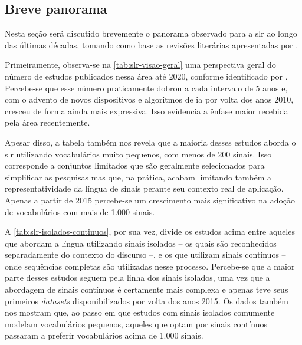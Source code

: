 \subsection{Breve panorama}
\label{sec:slr-breve-panorama}

Nesta seção será discutido brevemente o panorama observado para a \acrshort{slr} ao longo das últimas décadas, tomando como base as revisões literárias apresentadas por .



Primeiramente, observa-se na \autoref{tab:slr-visao-geral} uma perspectiva geral do número de estudos publicados nessa área até 2020, conforme identificado por .
Percebe-se que esse número praticamente dobrou a cada intervalo de 5 anos e, com o advento de novos dispositivos e algoritmos de \acrshort{ia} por volta dos anos 2010, cresceu de forma ainda mais expressiva. Isso evidencia a ênfase maior recebida pela área recentemente.

Apesar disso, a tabela também nos revela que a maioria desses estudos aborda o \acrshort{slr} utilizando vocabulários muito pequenos, com menos de 200 sinais. Isso corresponde a conjuntos limitados que são geralmente selecionados para simplificar as pesquisas mas que, na prática, acabam limitando também a representatividade da língua de sinais perante seu contexto real de aplicação.
Apenas a partir de 2015 percebe-se um crescimento mais significativo na adoção de vocabulários com mais de 1.000 sinais.






A \autoref{tab:slr-isolados-continuos}, por sua vez, divide os estudos acima entre aqueles que abordam a língua utilizando sinais isolados -- os quais são reconhecidos separadamente do contexto do discurso --, e os que utilizam sinais contínuos -- onde sequências completas são utilizadas nesse processo.
Percebe-se que a maior parte desses estudos seguem pela linha dos sinais isolados, uma vez que a abordagem de sinais contínuos é certamente mais complexa e apenas teve seus primeiros \textit{datasets} disponibilizados por volta dos anos 2015.
Os dados também nos mostram que, ao passo em que estudos com sinais isolados comumente modelam vocabulários pequenos, aqueles que optam por sinais contínuos passaram a preferir vocabulários acima de 1.000 sinais.

